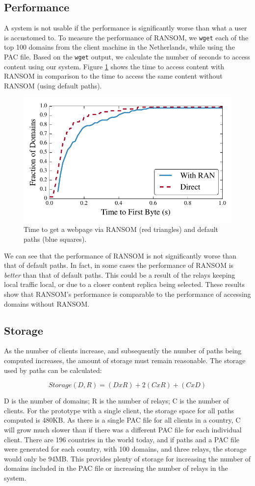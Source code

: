 \subsection{Performance}
A system is not usable if the performance is significantly worse than what a user
is accustomed to.  To measure the performance of RANSOM, we {\tt wget} each 
of the top 100 domains from the client machine in the Netherlands, while 
using the PAC file.  Based on the {\tt wget} output, we calculate the number 
of seconds to access content using our system. Figure \ref{fig:latency} shows 
the time to access content with RANSOM in comparison to the time to access the 
same content without RANSOM (using default paths).  

\begin{figure}[t]
\centering
\includegraphics[width=.5\textwidth]{latency}
\caption{Time to get a webpage via RANSOM (red triangles) and default paths (blue squares).}
\label{fig:latency}
\end{figure}

We can see that the performance of RANSOM is not significantly worse than that 
of default paths.  In fact, in some cases the performance of RANSOM is {\it 
better} than that of default paths.  This could be a result of the relays 
keeping local traffic local, or due to a closer content replica being selected. 
These results show that RANSOM's performance is comparable to the performance 
of accessing domains without RANSOM.

\subsection{Storage}
As the number of clients increase, and subsequently the number of paths being 
computed increases, the amount of storage must remain reasonable.  The storage 
used by paths can be calculated:

\[Storage(D,R) = (D x R) + 2(C x R) + (C x D) \]

D is the number of domains; R is the number of relays; C is the number of 
clients.  For the prototype with a single client, the storage space for all 
paths computed is 480KB.  As there is a single PAC file for all clients in 
a country, C will grow much slower than if there was a different PAC file for 
each individual client.  There are 196 countries in the world today, and if 
paths and a PAC file were generated for each country, with 100 domains, and 
three relays, the storage would only be 94MB.  This provides plenty of storage 
for increasing the number of domains included in the PAC file or increasing 
the number of relays in the system.

